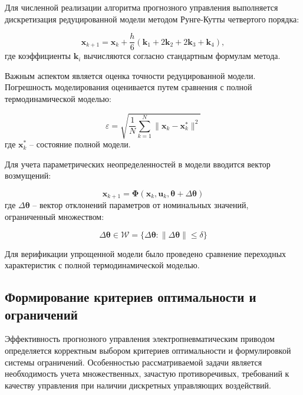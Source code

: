 Для численной реализации алгоритма прогнозного управления выполняется
дискретизация редуцированной модели методом Рунге-Кутты четвертого порядка:

\begin{equation}
\mathbf{x}_{k+1} = \mathbf{x}_k + \frac{h}{6}(\mathbf{k}_1 + 2\mathbf{k}_2 + 2\mathbf{k}_3 + \mathbf{k}_4),
\end{equation}
где коэффициенты $\mathbf{k}_i$ вычисляются согласно стандартным формулам метода.

Важным аспектом является оценка точности редуцированной модели. Погрешность
моделирования оценивается путем сравнения с полной термодинамической моделью:

\begin{equation}
\varepsilon = \sqrt{\frac{1}{N}\sum_{k=1}^N\|\mathbf{x}_k - \mathbf{x}_k^*\|^2}
\end{equation}
где $\mathbf{x}_k^*$ -- состояние полной модели.

Для учета параметрических неопределенностей в модели вводится вектор возмущений:

\begin{equation}
\mathbf{x}_{k+1} = \boldsymbol{\Phi}(\mathbf{x}_k, \mathbf{u}_k, \boldsymbol{\theta} + \Delta\boldsymbol{\theta})
\end{equation}
где $\Delta\boldsymbol{\theta}$ -- вектор отклонений параметров от номинальных значений, ограниченный множеством:

\begin{equation}
\Delta\boldsymbol{\theta} \in \mathcal{W} = \{\Delta\boldsymbol{\theta}: \|\Delta\boldsymbol{\theta}\| \leq \delta\}
\end{equation}

Для верификации упрощенной модели было проведено сравнение переходных характеристик с полной термодинамической моделью.

\subsection{Формирование критериев оптимальности и ограничений}\label{subsec:ch3/sec5/sub3}

Эффективность прогнозного управления электропневматическим приводом определяется корректным выбором
критериев оптимальности и формулировкой системы ограничений. Особенностью рассматриваемой задачи является
необходимость учета множественных, зачастую противоречивых,
требований к качеству управления при наличии дискретных управляющих воздействий.


